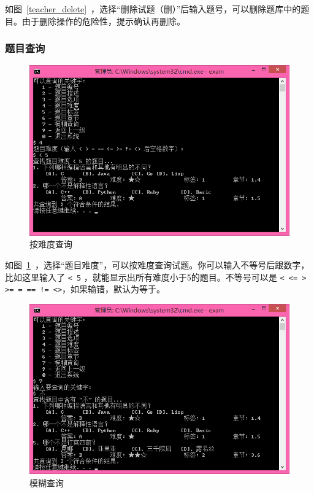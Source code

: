 如图~\ref{teacher_delete}~，选择“删除试题（删）”后输入题号，可以删除题库中的题目。由于删除操作的危险性，提示确认再删除。

\subsubsection{题目查询}

\begin{figure}[htp]
\includegraphics[width=\textwidth]{image/select_dif.png}
\caption{\label{select_dif}按难度查询}
\end{figure}

如图~\ref{select_dif}~，选择“题目难度”，可以按难度查询试题。你可以输入不等号后跟数字，比如这里输入了 \verb+< 5+ ，就能显示出所有难度小于5的题目。不等号可以是 \verb+< <= > >= = == != <>+，如果输错，默认为等于。

\begin{figure}[htp]
\includegraphics[width=\textwidth]{image/select_mul.png}
\caption{\label{select_mul}模糊查询}
\end{figure}

